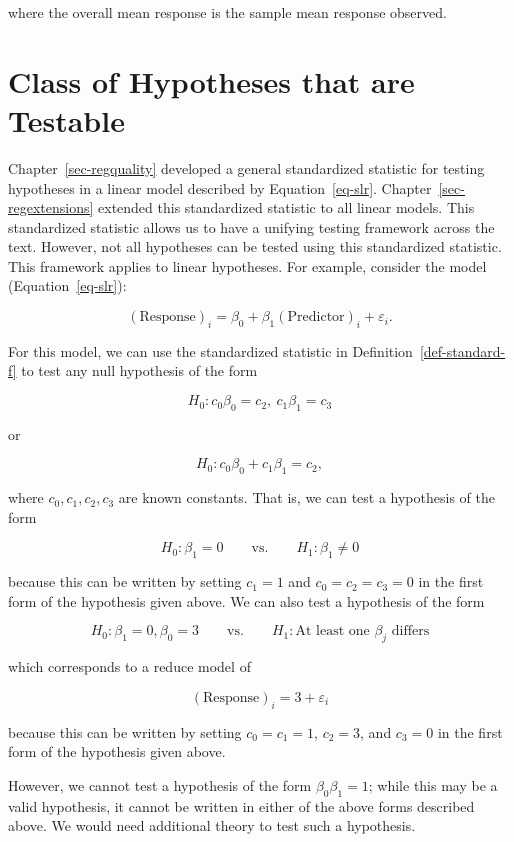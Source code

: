 \documentclass[
  letterpaper,
  DIV=11,
  numbers=noendperiod]{scrreprt}
\theoremstyle{plain}
\theoremstyle{definition}
\theoremstyle{definition}
\theoremstyle{remark}
\begin{document}
where the overall mean response is the sample mean response observed.

\section{Class of Hypotheses that are
Testable}\label{class-of-hypotheses-that-are-testable}

Chapter~\ref{sec-regquality} developed a general standardized statistic
for testing hypotheses in a linear model described by
Equation~\ref{eq-slr}. Chapter~\ref{sec-regextensions} extended this
standardized statistic to all linear models. This standardized statistic
allows us to have a unifying testing framework across the text. However,
not all hypotheses can be tested using this standardized statistic. This
framework applies to linear hypotheses. For example, consider the model
(Equation~\ref{eq-slr}):

\[(\text{Response})_i = \beta_0 + \beta_1 (\text{Predictor})_i + \varepsilon_i.\]

For this model, we can use the standardized statistic in
Definition~\ref{def-standard-f} to test any null hypothesis of the form

\[H_0: c_0\beta_0 = c_2, \ c_1\beta_1 = c_3\]

or

\[H_0: c_0\beta_0 + c_1\beta_1 = c_2,\]

where \(c_0, c_1, c_2, c_3\) are known constants. That is, we can test a
hypothesis of the form

\[H_0: \beta_1 = 0 \qquad \text{vs.} \qquad H_1: \beta_1 \neq 0\]

because this can be written by setting \(c_1 = 1\) and
\(c_0 = c_2 = c_3 = 0\) in the first form of the hypothesis given above.
We can also test a hypothesis of the form

\[H_0: \beta_1 = 0, \beta_0 = 3 \qquad \text{vs.} \qquad H_1: \text{At least one } \beta_j \text{ differs}\]

which corresponds to a reduce model of

\[(\text{Response})_i = 3 + \varepsilon_i\]

because this can be written by setting \(c_0 = c_1 = 1\), \(c_2 = 3\),
and \(c_3 = 0\) in the first form of the hypothesis given above.

However, we cannot test a hypothesis of the form \(\beta_0\beta_1 = 1\);
while this may be a valid hypothesis, it cannot be written in either of
the above forms described above. We would need additional theory to test
such a hypothesis.
\end{document}
